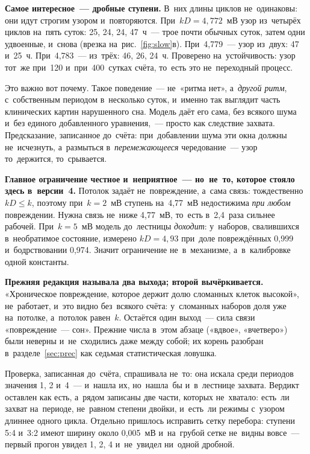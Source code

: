 \documentclass[11pt,a4paper,landscape,twocolumn]{article}
\begin{document}
\textbf{Самое интересное~— дробные ступени.} В~них длины циклов не~одинаковы: они идут строгим узором и~повторяются. При~$kD=4{,}772$~мВ узор из~четырёх циклов на~пять суток: 25, 24, 24, 47~ч~— трое почти обычных суток, затем одни удвоенные, и~снова (врезка на~рис.~\ref{fig:slow}в). При~4,779~— узор из~двух: 47 и~25~ч. При~4,783~— из~трёх: 46, 26, 24~ч. Проверено на~устойчивость: узор тот~же при~120 и~при~400~сутках счёта, то~есть это не~переходный процесс.

Это важно вот почему. Такое поведение~— не~«ритма нет», а~\emph{другой ритм}, с~собственным периодом в~несколько суток, и~именно так выглядит часть клинических картин нарушенного сна. Модель даёт его сама, без всякого шума и~без единого добавленного уравнения,~— просто как следствие захвата. Предсказание, записанное до~счёта: при~добавлении шума эти окна должны не~исчезнуть, а~размыться в~\emph{перемежающееся} чередование~— узор то~держится, то~срывается.

\textbf{Главное ограничение честное и~неприятное~— но~не~то, которое стояло здесь в~версии~4.} Потолок задаёт не~повреждение, а~сама связь: тождественно $kD\le k$, поэтому при~$k=2$~мВ ступень на~4,77~мВ недостижима \emph{при любом} повреждении. Нужна связь не~ниже 4,77~мВ, то~есть в~2,4~раза сильнее рабочей. При~$k=5$~мВ модель до~лестницы \emph{доходит}: у~наборов, свалившихся в~необратимое состояние, измерено $kD=4{,}93$ при~доле повреждённых 0,999 и~бодрствовании 0,974. Значит ограничение не~в~механизме, а~в~калибровке одной константы.

\textbf{Прежняя редакция называла два выхода; второй вычёркивается.} «Хроническое повреждение, которое держит долю сломанных клеток высокой», не~работает, и~это видно без~всякого счёта: у~сломанных наборов доля уже на~потолке, а~потолок равен~$k$. Остаётся один выход~— сила связи «повреждение~— сон». Прежние числа в~этом абзаце («вдвое», «вчетверо») были неверны и~не~сходились даже между собой; их корень разобран в~разделе~\ref{sec:prec} как седьмая статистическая ловушка.

\begin{note}
Проверка, записанная до~счёта, спрашивала не~то: она искала среди периодов значения 1, 2 и~4~— и~нашла их, но~нашла~бы и~в~лестнице захвата. Вердикт оставлен как есть, а~рядом записаны две части, которых не~хватало: есть~ли захват на~периоде, не~равном степени двойки, и~есть~ли режимы с~узором длиннее одного цикла. Отдельно пришлось исправить сетку перебора: ступени 5:4 и~3:2 имеют ширину около 0,005~мВ и~на~грубой сетке не~видны вовсе~— первый прогон увидел 1, 2, 4 и~не~увидел ни~одной дробной.
\end{note}
\end{document}
